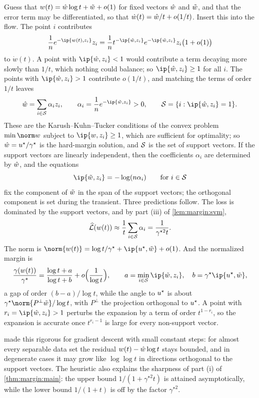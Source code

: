 \begin{refsection}
\begin{heuristic}
Guess that $w(t)=\hat w\log t+\tilde w+o(1)$ for fixed vectors $\hat w$ and $\tilde w$, and that the error term may be differentiated, so that $\dot w(t)=\hat w/t+o(1/t)$. Insert this into the flow. The point $i$ contributes
\[
  \frac1ne^{-\ip{w(t),z_i}}z_i=\frac1nt^{-\ip{\marginwhat,z_i}}e^{-\ip{\marginwt,z_i}}z_i\bigl(1+o(1)\bigr)
\]
to $\dot w(t)$. A point with $\ip{\marginwhat,z_i}<1$ would contribute a term decaying more slowly than $1/t$, which nothing could balance; so $\ip{\marginwhat,z_i}\ge1$ for all $i$. The points with $\ip{\marginwhat,z_i}>1$ contribute $o(1/t)$, and matching the terms of order $1/t$ leaves
\[
  \marginwhat=\sum_{i\in\marginS}\alpha_iz_i,\qquad \alpha_i=\frac1ne^{-\ip{\marginwt,z_i}}>0,\qquad \marginS=\{i:\ip{\marginwhat,z_i}=1\}.
\]
These are the Karush--Kuhn--Tucker conditions of the convex problem $\min\norm w$ subject to $\ip{w,z_i}\ge1$, which are sufficient for optimality; so $\hat w=u^\star/\gamma^\star$ is the hard-margin solution, and $\mathcal S$ is the set of support vectors. If the support vectors are linearly independent, then the coefficients $\alpha_i$ are determined by $\hat w$, and the equations
\begin{equation}\label{eq:margin:wtilde}
  \ip{\marginwt,z_i}=-\log(n\alpha_i)\qquad\text{for }i\in\marginS
\end{equation}
fix the component of $\tilde w$ in the span of the support vectors; the orthogonal component is set during the transient. Three predictions follow. The loss is dominated by the support vectors, and by part (iii) of \cref{lem:margin:svm},
\[
  \widehat{\mathcal{L}}(w(t))\approx\frac1t\sum_{i\in\mathcal S}\alpha_i=\frac1{\gamma^{\star2}t}.
\]
The norm is $\norm{w(t)}=\log t/\gamma^\star+\ip{\marginu,\marginwt}+o(1)$. And the normalized margin is
\[
  \frac{\gamma(w(t))}{\gamma^\star}=\frac{\log t+a}{\log t+b}+o\Bigl(\frac1{\log t}\Bigr),\qquad a=\min_{i\in\marginS}\ip{\marginwt,z_i},\quad b=\gamma^\star\ip{\marginu,\marginwt},
\]
a gap of order $(b-a)/\log t$, while the angle to $u^\star$ is about $\gamma^\star\norm{P^\perp\marginwt}/\log t$, with $P^\perp$ the projection orthogonal to $u^\star$. A point with $r_i=\ip{\marginwhat,z_i}>1$ perturbs the expansion by a term of order $t^{1-r_i}$, so the expansion is accurate once $t^{r_i-1}$ is large for every non-support vector.
\end{heuristic}

\Textcite{SoudryEtAl2018} made this rigorous for gradient descent with small constant steps: for almost every separable data set the residual $w(t)-\hat w\log t$ stays bounded, and in degenerate cases it may grow like $\log\log t$ in directions orthogonal to the support vectors. The heuristic also explains the sharpness of part (i) of \cref{thm:margin:main}: the upper bound $1/(1+\gamma^{\star2}t)$ is attained asymptotically, while the lower bound $1/(1+t)$ is off by the factor $\gamma^{\star2}$.


\end{refsection}
